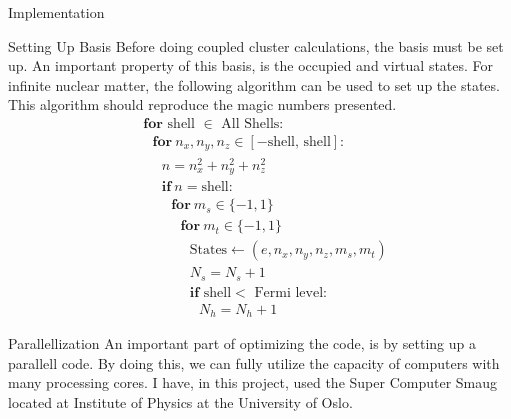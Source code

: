 \documentclass[twoside,english]{uiofysmaster}
\begin{document}
\begin{chapter}{Implementation}
	\begin{section}{Setting Up Basis}
		Before doing coupled cluster calculations, the basis must be set up. An important property of this basis, is the occupied and virtual states. For infinite nuclear matter, the following algorithm can be used to set up the states. This algorithm should reproduce the magic numbers presented. 
		\begin{align*}
			&\mathbf{for } \text{ shell } \in \text{ All Shells}: \\
			&\:\:\:\mathbf{for } \: n_x, n_y, n_z \in [-\text{shell, shell} ]: \\
			&\:\:\:\:\:\:n = n_x^2 + n_y^2 + n_z^2 \\
			&\:\:\:\:\:\:\mathbf{if }\: n = \text{shell}: \\
			&\:\:\:\:\:\:\:\:\:\mathbf{for } \: m_s \in \{-1,1\} \\
			&\:\:\:\:\:\:\:\:\:\:\:\: \mathbf{for } \: m_t \in \{-1,1\} \\
			&\:\:\:\:\:\:\:\:\:\:\:\:\:\:\:\text{States} \leftarrow (e, n_x, n_y, n_z, m_s, m_t) \\
			&\:\:\:\:\:\:\:\:\:\:\:\:\:\:\:N_s = N_s + 1 \\
			&\:\:\:\:\:\:\:\:\:\:\:\:\:\:\:\mathbf{if } \text{ shell} < \text{ Fermi level}: \\
			&\:\:\:\:\:\:\:\:\:\:\:\:\:\:\:\:\:\: N_h = N_h + 1
		\end{align*}
	\end{section}

	\begin{section}{Parallellization}
		An important part of optimizing the code, is by setting up a parallell code. By doing this, we can fully utilize the capacity of computers with many processing cores. I have, in this project, used the Super Computer Smaug located at Institute of Physics at the University of Oslo. 
	\end{section}

\end{chapter}
\end{document}
